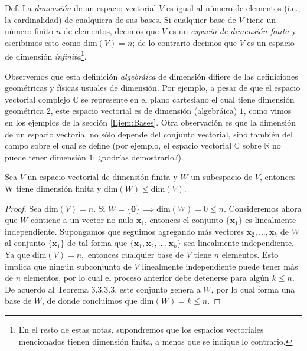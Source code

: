 \documentclass[12pt]{article}
\newenvironment{teorema}[2][Teorema]{\begin{trivlist}
\item[\hskip \labelsep {\bfseries #1}\hskip \labelsep {\bfseries #2.}]}{\end{trivlist}}
\begin{document}
\begin{tcolorbox}

    \underline{Def.} La \emph{dimensión} de un espacio vectorial $V$ es igual al número de elementos (i.e., la cardinalidad) de cualquiera de sus bases. Si cualquier base de $V$ tiene un número finito $n$ de elementos, decimos que $V$ es un \emph{espacio de dimensión finita} y escribimos esto como $\text{dim}(V)=n$; de lo contrario decimos que $V$ es un espacio de dimensión \emph{infinita}\footnote{En el resto de estas notas, supondremos que los espacios vectoriales mencionados tienen dimensión finita, a menos que se indique lo contrario.}.

\end{tcolorbox}

Observemos que esta definición \emph{algebráica} de dimensión difiere de las definiciones geométricas y físicas usuales de dimensión. Por ejemplo, a pesar de que el espacio vectorial complejo $\mathbb{C}$ se represente en el plano cartesiano \textemdash el cual tiene dimensión geométrica $2$\textemdash\hspace{0.5mm}, este espacio vectorial es de dimensión (algebráica) $1$, como vimos en los ejemplos de la sección \ref{Ejem:Bases}. Otra observación es que la dimensión de un espacio vectorial no sólo depende del conjunto vectorial, sino también del campo sobre el cual se define (por ejemplo, el espacio vectorial $\mathbb{C}$ sobre $\mathbb{R}$ no puede tener dimensión $1$: ¿podrías demostrarlo?).

\begin{teorema} {4.2.2}
    Sea $V$ un espacio vectorial de dimensión finita y $W$ un subespacio de $V$, entonces W tiene dimensión finita y $\text{dim}(W)\le \text{dim}(V).$ 

\begin{proof}

    Sea $\text{dim}(V)=n.$ Si $W=\{\mathbf{0}\} \implies \text{dim}(W)=0\le n.$ Consideremos ahora que $W$ contiene a un vector no nulo $\mathbf{x}_1$, entonces el conjunto $\{\mathbf{x}_1\}$ es linealmente independiente. Supongamos que seguimos agregando más vectores $\mathbf{x}_2,...,\mathbf{x}_k$ de $W$ al conjunto $\{\mathbf{x}_1\} $ de tal forma que $\{\mathbf{x}_1,\mathbf{x}_2,...,\mathbf{x}_k\}$ sea linealmente independiente. Ya que $\text{dim}(V)=n,$ entonces cualquier base de $V$ tiene $n$ elementos. Esto implica que ningún subconjunto de $V$ linealmente independiente puede tener más de $n$ elementos, por lo cual el proceso anterior debe detenerse para algún $k\le n.$ De acuerdo al Teorema 3.3.3.3, este conjunto genera a $W$, por lo cual forma una base de $W$, de donde concluimos que $\text{dim}(W)=k\le n.$

\end{proof}

\end{teorema}
\end{document}
